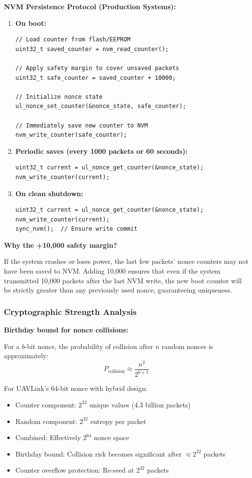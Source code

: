 \documentclass[11pt,a4paper]{article}
\begin{document}
\textbf{NVM Persistence Protocol (Production Systems):}

\begin{enumerate}[noitemsep]
    \item \textbf{On boot:}
    \begin{lstlisting}
// Load counter from flash/EEPROM
uint32_t saved_counter = nvm_read_counter();

// Apply safety margin to cover unsaved packets
uint32_t safe_counter = saved_counter + 10000;

// Initialize nonce state
ul_nonce_set_counter(&nonce_state, safe_counter);

// Immediately save new counter to NVM
nvm_write_counter(safe_counter);
    \end{lstlisting}
    
    \item \textbf{Periodic saves (every 1000 packets or 60 seconds):}
    \begin{lstlisting}
uint32_t current = ul_nonce_get_counter(&nonce_state);
nvm_write_counter(current);
    \end{lstlisting}
    
    \item \textbf{On clean shutdown:}
    \begin{lstlisting}
uint32_t current = ul_nonce_get_counter(&nonce_state);
nvm_write_counter(current);
sync_nvm();  // Ensure write commit
    \end{lstlisting}
\end{enumerate}

\textbf{Why the +10,000 safety margin?}

If the system crashes or loses power, the last few packets' nonce counters may not have been saved to NVM. Adding 10,000 ensures that even if the system transmitted 10,000 packets after the last NVM write, the new boot counter will be strictly greater than any previously used nonce, guaranteeing uniqueness.

\subsubsection{Cryptographic Strength Analysis}

\textbf{Birthday bound for nonce collisions:}

For a $b$-bit nonce, the probability of collision after $n$ random nonces is approximately:
$$P_{\text{collision}} \approx \frac{n^2}{2^{b+1}}$$

For UAVLink's 64-bit nonce with hybrid design:
\begin{itemize}[noitemsep]
    \item Counter component: $2^{32}$ unique values (4.3 billion packets)
    \item Random component: $2^{32}$ entropy per packet
    \item Combined: Effectively $2^{64}$ nonce space
    \item Birthday bound: Collision risk becomes significant after $\approx 2^{32}$ packets
    \item Counter overflow protection: Re-seed at $2^{32}$ packets
\end{itemize}
\end{document}
